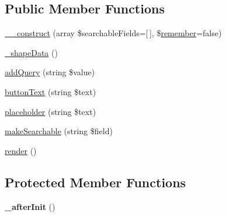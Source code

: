 \subsection*{Public Member Functions}
\begin{DoxyCompactItemize}
\item 
\hyperlink{classhamburgscleanest_1_1_data_tables_1_1_models_1_1_data_components_1_1_data_scout_a4df8c4487c6a066c0748c13e1b986e75}{\+\_\+\+\_\+construct} (array \$searchable\+Fields=\mbox{[}$\,$\mbox{]}, \$\hyperlink{classhamburgscleanest_1_1_data_tables_1_1_models_1_1_data_component_a565ac6563f3548952f5b3b9807799d17}{remember}=false)
\item 
\hyperlink{classhamburgscleanest_1_1_data_tables_1_1_models_1_1_data_components_1_1_data_scout_a6d4fda1024fd883f0750e5f0c531160d}{\+\_\+shape\+Data} ()
\item 
\hyperlink{classhamburgscleanest_1_1_data_tables_1_1_models_1_1_data_components_1_1_data_scout_ad7dba2ef84f122056dce30d452f0e322}{add\+Query} (string \$value)
\item 
\hyperlink{classhamburgscleanest_1_1_data_tables_1_1_models_1_1_data_components_1_1_data_scout_a22411300faae3d9467b9ac2e9be16251}{button\+Text} (string \$text)
\item 
\hyperlink{classhamburgscleanest_1_1_data_tables_1_1_models_1_1_data_components_1_1_data_scout_a51d7d08dff5febd430219ac2642d6935}{placeholder} (string \$text)
\item 
\hyperlink{classhamburgscleanest_1_1_data_tables_1_1_models_1_1_data_components_1_1_data_scout_a24951165ffdc4b878efb2cc17748dea7}{make\+Searchable} (string \$field)
\item 
\hyperlink{classhamburgscleanest_1_1_data_tables_1_1_models_1_1_data_components_1_1_data_scout_afde88292c44dc59faf017738dae6dffb}{render} ()
\end{DoxyCompactItemize}
\subsection*{Protected Member Functions}
\begin{DoxyCompactItemize}
\item 
\mbox{\label{classhamburgscleanest_1_1_data_tables_1_1_models_1_1_data_components_1_1_data_scout_a8b97dff3fa609aaed04b448e535ba0cc}} 
{\bfseries \+\_\+after\+Init} ()
\end{DoxyCompactItemize}
